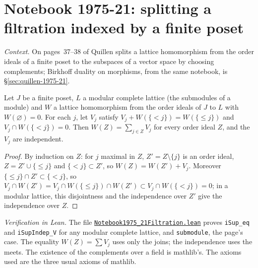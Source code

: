 \section[Notebook 1975-21: splitting a filtration]{Notebook 1975-21: splitting a filtration indexed by a finite poset\protect{}}\label{sec:quillen-1975-21-filtration}

\emph{Context.} On pages~37--38 of  Quillen splits a lattice homomorphism from the order ideals of a finite poset to the subspaces of a vector space by choosing complements; Birkhoff duality on morphisms, from the same notebook, is \S\ref{sec:quillen-1975-21}.

\begin{encadre}
\begin{theoreme}\label{thm:quillen-1975-21-filtration}
Let $J$ be a finite poset, $L$ a modular complete lattice (the submodules of a module) and $W$ a lattice homomorphism from the order ideals of $J$ to $L$ with $W(\varnothing) = 0$. For each $j$, let $V_j$ satisfy $V_j + W(\{<j\}) = W(\{\le j\})$ and $V_j \cap W(\{<j\}) = 0$. Then $W(Z) = \sum_{j \in Z}V_j$ for every order ideal $Z$, and the $V_j$ are independent.
\end{theoreme}
\end{encadre}

\begin{proof}
By induction on $Z$: for $j$ maximal in $Z$, $Z' = Z \setminus \{j\}$ is an order ideal, $Z = Z' \cup \{\le j\}$ and $\{<j\} \subset Z'$, so $W(Z) = W(Z') + V_j$. Moreover $\{\le j\} \cap Z' \subset \{<j\}$, so $V_j \cap W(Z') = V_j \cap W(\{\le j\}) \cap W(Z') \subset V_j \cap W(\{<j\}) = 0$; in a modular lattice, this disjointness and the independence over $Z'$ give the independence over $Z$.
\end{proof}

\emph{Verification in Lean.} The file \href{\leanblobmain/Notebook1975_21Filtration.lean}{\texttt{Notebook1975\_21Filtration.\allowbreak{}lean}} proves \texttt{iSup\_eq} and \texttt{iSupIndep\_V} for any modular complete lattice, and \texttt{submodule}, the page's case. The equality $W(Z) = \sum V_j$ uses only the joins; the independence uses the meets. The existence of the complements over a field is mathlib's. The axioms used are the three usual axioms of mathlib.

